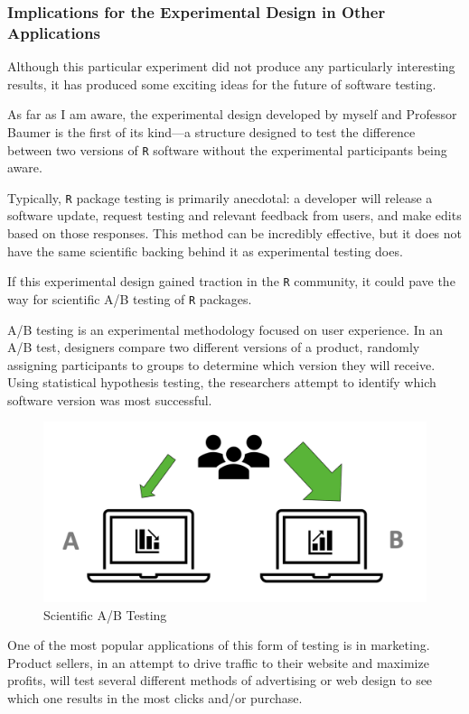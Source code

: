 \documentclass[12pt,twoside]{reedthesis}
\begin{document}
\hypertarget{implications-for-the-experimental-design-in-other-applications}{%
\subsubsection{Implications for the Experimental Design in Other Applications}\label{implications-for-the-experimental-design-in-other-applications}}

Although this particular experiment did not produce any particularly interesting results, it has produced some exciting ideas for the future of software testing.

As far as I am aware, the experimental design developed by myself and Professor Baumer is the first of its kind---a structure designed to test the difference between two versions of \texttt{R} software without the experimental participants being aware.

Typically, \texttt{R} package testing is primarily anecdotal: a developer will release a software update, request testing and relevant feedback from users, and make edits based on those responses. This method can be incredibly effective, but it does not have the same scientific backing behind it as experimental testing does.

If this experimental design gained traction in the \texttt{R} community, it could pave the way for scientific A/B testing of \texttt{R} packages.

A/B testing is an experimental methodology focused on user experience. In an A/B test, designers compare two different versions of a product, randomly assigning participants to groups to determine which version they will receive. Using statistical hypothesis testing, the researchers attempt to identify which software version was most successful.
\begin{figure}
\includegraphics[width=1\linewidth]{figure/a-b_testing} \caption{Scientific A/B Testing}\label{fig:unnamed-chunk-86}
\end{figure}
One of the most popular applications of this form of testing is in marketing. Product sellers, in an attempt to drive traffic to their website and maximize profits, will test several different methods of advertising or web design to see which one results in the most clicks and/or purchase.
\end{document}
